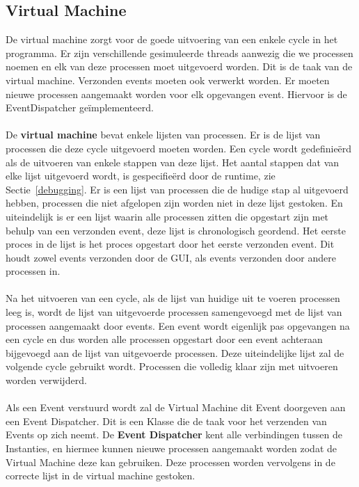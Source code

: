 \documentclass[]{article}
\begin{document}
\subsection{Virtual Machine}
\label{VM}
De virtual machine zorgt voor de goede uitvoering van een enkele cycle in het programma. Er zijn verschillende gesimuleerde threads aanwezig die we processen noemen en elk van deze processen moet uitgevoerd worden. Dit is de taak van de virtual machine. Verzonden events moeten ook verwerkt worden. Er moeten nieuwe processen aangemaakt worden voor elk opgevangen event. Hiervoor is de EventDispatcher ge\"implementeerd. \\\\
De \textbf{virtual machine} bevat enkele lijsten van processen. Er is de lijst van processen die deze cycle uitgevoerd moeten worden. Een cycle wordt gedefinie\"erd als de uitvoeren van enkele stappen van deze lijst. Het aantal stappen dat van elke lijst uitgevoerd wordt, is gespecifie\"erd door de runtime, zie Sectie~\ref{debugging}. Er is een lijst van processen die de hudige stap al uitgevoerd hebben, processen die niet afgelopen zijn worden niet in deze lijst gestoken. En uiteindelijk is er een lijst waarin alle processen zitten die opgestart zijn met behulp van een verzonden event, deze lijst is chronologisch geordend. Het eerste proces in de lijst is het proces opgestart door het eerste verzonden event. Dit houdt zowel events verzonden door de GUI, als events verzonden door andere processen in. \\\\
Na het uitvoeren van een cycle, als de lijst van huidige uit te voeren processen leeg is, wordt de lijst van uitgevoerde processen samengevoegd met de lijst van processen aangemaakt door events. Een event wordt eigenlijk pas opgevangen na een cycle en dus worden alle processen opgestart door een event achteraan bijgevoegd aan de lijst van uitgevoerde processen. Deze uiteindelijke lijst zal de volgende cycle gebruikt wordt. Processen die volledig klaar zijn met uitvoeren worden verwijderd. \\\\
Als een Event verstuurd wordt zal de Virtual Machine dit Event doorgeven aan een Event Dispatcher. Dit is een Klasse die de taak voor het verzenden van Events op zich neemt. De \textbf{Event Dispatcher} kent alle verbindingen tussen de Instanties, en hiermee kunnen nieuwe processen aangemaakt worden zodat de Virtual Machine deze kan gebruiken. Deze processen worden vervolgens in de correcte lijst in de virtual machine gestoken.
\end{document}
